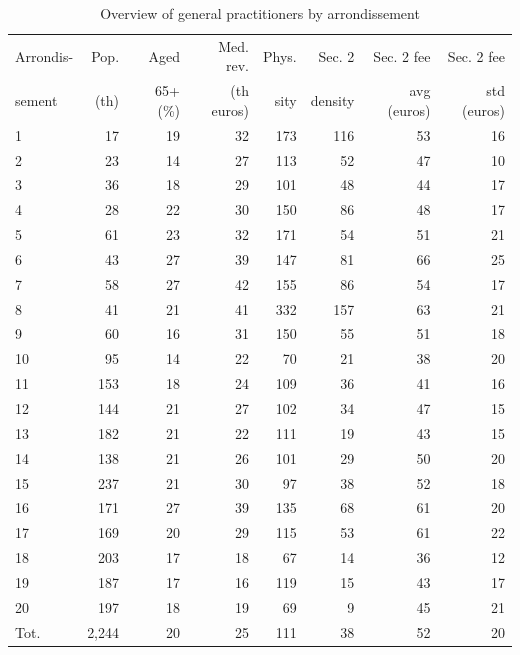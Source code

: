 \documentclass[11pt]{article}
\begin{document}
\begin{table}[h]
\caption{Overview of general practitioners by arrondissement}
\label{tab:GP_stats_des}
\begin{tabular}{lrrrrrrr}
\hline
\hline
Arrondis-      & Pop.      & Aged       & Med. rev.  & Phys.  & Sec. 2  & Sec. 2 fee  & Sec. 2 fee  \\
sement         & (th)      & 65+ (\%)   & (th euros) & sity   & density & avg (euros) & std (euros) \\
\hline
1     & 17    & 19    & 32    & 173   & 116   & 53    & 16 \\
2     & 23    & 14    & 27    & 113   & 52    & 47    & 10 \\
3     & 36    & 18    & 29    & 101   & 48    & 44    & 17 \\
4     & 28    & 22    & 30    & 150   & 86    & 48    & 17 \\
5     & 61    & 23    & 32    & 171   & 54    & 51    & 21 \\
6     & 43    & 27    & 39    & 147   & 81    & 66    & 25 \\
7     & 58    & 27    & 42    & 155   & 86    & 54    & 17 \\
8     & 41    & 21    & 41    & 332   & 157   & 63    & 21 \\
9     & 60    & 16    & 31    & 150   & 55    & 51    & 18 \\
10    & 95    & 14    & 22    & 70    & 21    & 38    & 20 \\
11    & 153   & 18    & 24    & 109   & 36    & 41    & 16 \\
12    & 144   & 21    & 27    & 102   & 34    & 47    & 15 \\
13    & 182   & 21    & 22    & 111   & 19    & 43    & 15 \\
14    & 138   & 21    & 26    & 101   & 29    & 50    & 20 \\
15    & 237   & 21    & 30    & 97    & 38    & 52    & 18 \\
16    & 171   & 27    & 39    & 135   & 68    & 61    & 20 \\
17    & 169   & 20    & 29    & 115   & 53    & 61    & 22 \\
18    & 203   & 17    & 18    & 67    & 14    & 36    & 12 \\
19    & 187   & 17    & 16    & 119   & 15    & 43    & 17 \\
20    & 197   & 18    & 19    & 69    & 9     & 45    & 21 \\
\hline
Tot. & 2,244  & 20    & 25    & 111   & 38    & 52    & 20 \\
\hline
\hline
\end{tabular}%
\end{table}
\end{document}
